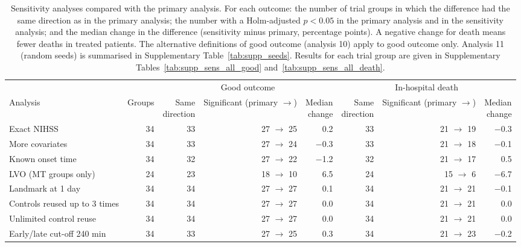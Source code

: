 \begin{table}[H]
\centering
\small
\caption{Sensitivity analyses compared with the primary analysis. For each outcome: the number of trial groups in which the difference had the same direction as in the primary analysis; the number with a Holm-adjusted $p < 0.05$ in the primary analysis and in the sensitivity analysis; and the median change in the difference (sensitivity minus primary, percentage points). A negative change for death means fewer deaths in treated patients. The alternative definitions of good outcome (analysis 10) apply to good outcome only. Analysis 11 (random seeds) is summarised in Supplementary Table~\ref{tab:supp_seeds}. Results for each trial group are given in Supplementary Tables~\ref{tab:supp_sens_all_good} and~\ref{tab:supp_sens_all_death}.}
\label{tab:sensitivity}
\begin{tabular}{lrrrrrrr}
\toprule
 & & \multicolumn{3}{c}{Good outcome} & \multicolumn{3}{c}{In-hospital death} \\
\cmidrule(lr){3-5}\cmidrule(lr){6-8}
Analysis & Groups & \makecell{Same\\direction} & \makecell{Significant\\(primary $\rightarrow$)} & \makecell{Median\\change} & \makecell{Same\\direction} & \makecell{Significant\\(primary $\rightarrow$)} & \makecell{Median\\change} \\
\midrule
Exact NIHSS & 34 & 33 & 27 $\rightarrow$ 25 & 0.2 & 33 & 21 $\rightarrow$ 19 & $-$0.3 \\
More covariates & 34 & 33 & 27 $\rightarrow$ 24 & $-$0.3 & 33 & 21 $\rightarrow$ 18 & $-$0.1 \\
Known onset time & 34 & 32 & 27 $\rightarrow$ 22 & $-$1.2 & 32 & 21 $\rightarrow$ 17 & 0.5 \\
LVO (MT groups only) & 24 & 23 & 18 $\rightarrow$ 10 & 6.5 & 24 & 15 $\rightarrow$ 6 & $-$6.7 \\
Landmark at 1 day & 34 & 34 & 27 $\rightarrow$ 27 & 0.1 & 34 & 21 $\rightarrow$ 21 & $-$0.1 \\
\addlinespace
Controls reused up to 3 times & 34 & 34 & 27 $\rightarrow$ 27 & 0.0 & 34 & 21 $\rightarrow$ 21 & 0.0 \\
Unlimited control reuse & 34 & 34 & 27 $\rightarrow$ 27 & 0.0 & 34 & 21 $\rightarrow$ 21 & 0.0 \\
Early/late cut-off 240 min & 34 & 33 & 27 $\rightarrow$ 25 & 0.3 & 34 & 21 $\rightarrow$ 23 & $-$0.2 \\

\end{tabular}
\end{table}
